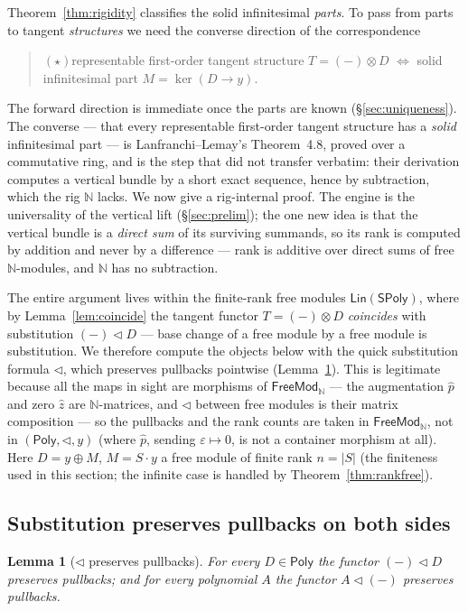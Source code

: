 \documentclass[11pt]{article}
\newtheorem{lemma}[theorem]{Lemma}
\theoremstyle{definition}
\newcommand{\SPoly}{\mathsf{SPoly}}
\newcommand{\Lin}{\mathsf{Lin}}
\newcommand{\FreeMod}{\mathsf{FreeMod}}
\newcommand{\Poly}{\mathsf{Poly}}
\newcommand{\N}{\mathbb{N}}
\renewcommand{\ker}{\operatorname{ker}}
\begin{document}
Theorem~\ref{thm:rigidity} classifies the solid infinitesimal \emph{parts}. To pass from parts to
tangent \emph{structures} we need the converse direction of the correspondence
\begin{quote}
$(\star)$\quad representable first-order tangent structure $T=(-)\otimes D$ $\iff$ solid infinitesimal
part $M=\ker(D\to y)$.
\end{quote}
The forward direction is immediate once the parts are known (\S\ref{sec:uniqueness}). The converse
--- that every representable first-order tangent structure has a \emph{solid} infinitesimal part ---
is Lanfranchi--Lemay's Theorem~4.8, proved over a commutative ring, and is the step that did not
transfer verbatim: their derivation computes a vertical bundle by a short exact sequence, hence by
subtraction, which the rig $\N$ lacks. We now give a rig-internal proof. The engine is the
universality of the vertical lift (\S\ref{sec:prelim}); the one new idea is that the vertical bundle
is a \emph{direct sum} of its surviving summands, so its rank is computed by addition and never by a
difference --- rank is additive over direct sums of free $\N$-modules, and $\N$ has no subtraction.

The entire argument lives within the finite-rank free modules $\Lin(\SPoly)$, where by Lemma~\ref{lem:coincide}
the tangent functor $T=(-)\otimes D$ \emph{coincides} with substitution $(-)\lhd D$ --- base change
of a free module by a free module is substitution. We therefore compute the objects below with the
quick substitution formula $\lhd$, which preserves pullbacks pointwise (Lemma~\ref{lem:pullback}).
This is legitimate because all the maps in sight are morphisms of $\FreeMod_\N$ --- the augmentation
$\hat p$ and zero $\hat z$ are $\N$-matrices, and $\lhd$ between free modules is their matrix
composition --- so the pullbacks and the rank counts are taken in $\FreeMod_\N$, not in
$(\Poly,\lhd,y)$ (where $\hat p$, sending $\varepsilon\mapsto0$, is not a container morphism at all).
Here $D=y\oplus M$, $M=S\cdot y$ a free module of finite rank $n=|S|$ (the finiteness used in this
section; the infinite case is handled by Theorem~\ref{thm:rankfree}).

\subsection{Substitution preserves pullbacks on both sides}

\begin{lemma}[$\lhd$ preserves pullbacks]\label{lem:pullback}
For every $D\in\Poly$ the functor $(-)\lhd D$ preserves pullbacks; and for every polynomial $A$ the
functor $A\lhd(-)$ preserves pullbacks.
\end{lemma}
\end{document}
